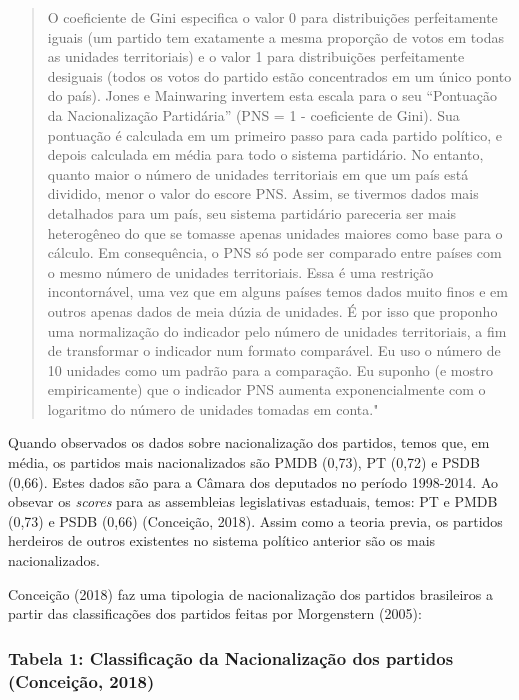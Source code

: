\documentclass[]{article}
\begin{document}
\begin{quote}
O coeficiente de Gini especifica o valor 0 para distribuições
perfeitamente iguais (um partido tem exatamente a mesma proporção de
votos em todas as unidades territoriais) e o valor 1 para distribuições
perfeitamente desiguais (todos os votos do partido estão concentrados em
um único ponto do país). Jones e Mainwaring invertem esta escala para o
seu ``Pontuação da Nacionalização Partidária'' (PNS = 1 - coeficiente de
Gini). Sua pontuação é calculada em um primeiro passo para cada partido
político, e depois calculada em média para todo o sistema partidário. No
entanto, quanto maior o número de unidades territoriais em que um país
está dividido, menor o valor do escore PNS. Assim, se tivermos dados
mais detalhados para um país, seu sistema partidário pareceria ser mais
heterogêneo do que se tomasse apenas unidades maiores como base para o
cálculo. Em consequência, o PNS só pode ser comparado entre países com o
mesmo número de unidades territoriais. Essa é uma restrição
incontornável, uma vez que em alguns países temos dados muito finos e em
outros apenas dados de meia dúzia de unidades. É por isso que proponho
uma normalização do indicador pelo número de unidades territoriais, a
fim de transformar o indicador num formato comparável. Eu uso o número
de 10 unidades como um padrão para a comparação. Eu suponho (e mostro
empiricamente) que o indicador PNS aumenta exponencialmente com o
logaritmo do número de unidades tomadas em conta."
\end{quote}

Quando observados os dados sobre nacionalização dos partidos, temos que,
em média, os partidos mais nacionalizados são PMDB (0,73), PT (0,72) e
PSDB (0,66). Estes dados são para a Câmara dos deputados no período
1998-2014. Ao obsevar os \emph{scores} para as assembleias legislativas
estaduais, temos: PT e PMDB (0,73) e PSDB (0,66) (Conceição, 2018).
Assim como a teoria previa, os partidos herdeiros de outros existentes
no sistema político anterior são os mais nacionalizados.

Conceição (2018) faz uma tipologia de nacionalização dos partidos
brasileiros a partir das classificações dos partidos feitas por
Morgenstern (2005):

\subsubsection{Tabela 1: Classificação da Nacionalização dos partidos
(Conceição,
2018)}\label{tabela-1-classificacao-da-nacionalizacao-dos-partidos-conceicao-2018}
\end{document}
